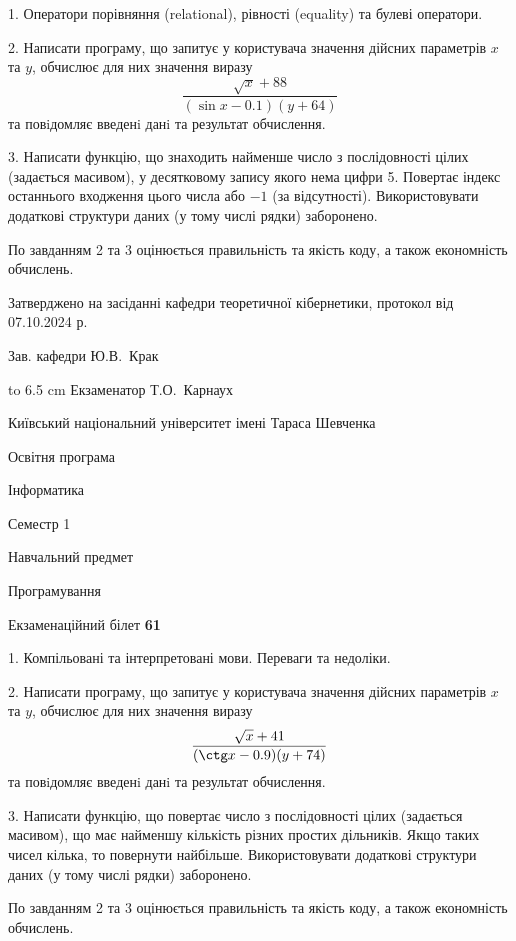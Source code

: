 \documentclass[12pt, ukrainian]{article}
\begin{document}
{%
1. Оператори порівняння (relational), рівності (equality) та булеві оператори.%
\par
2. Написати програму, що запитує у користувача значення дійсних параметрів $x$ та $y$, обчислює для них значення виразу 
$$\frac{\sqrt x + 88}{(\sin x - 0.1) (y + 64)}$$ 
та повiдомляє введенi данi та результат обчислення.

\par
3. Написати функцію, що знаходить найменше число з послідовності цілих (задається масивом), у десятковому запису якого нема цифри 5. Повертає індекс останнього входження цього числа або $-1$ (за відсутності). Використовувати додаткові структури даних (у тому числі рядки) заборонено.

По завданням 2 та 3 оцінюється правильність та якість коду, а також економність обчислень.

}
{\smallskip\smallskip \begin {scriptsize} Затверджено на засіданні кафедри теоретичної кібернетики, протокол   від   07.10.2024 р.\par\smallskip\smallskip\smallskip\smallskip
{\parbox {6.5 cm} {Зав. кафедри \dotfill Ю.В.~Крак}}\hspace {0.7cm} {\hbox to 6.5 cm { Екзаменатор \dotfill Т.О.~Карнаух}} \end{scriptsize}}
\newpage
{{\begin {scriptsize}\par
{ \center  Київський національний університет імені Тараса Шевченка \par}
{\parbox {5 cm}{Освітня програма \hfill}{\parbox {7 cm}{Інформатика\hfill}}\parbox {6 cm}{\hfill Семестр 1}}\par
{\parbox {5 cm} {Навчальний предмет \hfill}\parbox {7 cm}{Програмування \hfill}\parbox {6cm}{\hfill}\par}\vspace{-15pt} \end{scriptsize}}{\center Екзаменаційний білет \No \textbf { 61 }\par}}
{%
1. Компільовані та інтерпретовані мови. Переваги та недоліки.%
\par
2. Написати програму, що запитує у користувача значення дійсних параметрів $x$ та $y$, обчислює для них значення виразу 
$$\frac{\sqrt x + 41}{(\ctg x - 0.9) (y + 74)}$$ 
та повiдомляє введенi данi та результат обчислення.

\par
3. Написати функцію, що повертає число з послідовності цілих (задається масивом), що має найменшу кількість різних простих дільників. Якщо таких чисел кілька, то повернути найбільше. Використовувати додаткові структури даних (у тому числі рядки) заборонено.

По завданням 2 та 3 оцінюється правильність та якість коду, а також економність обчислень.

}
\end{document}
